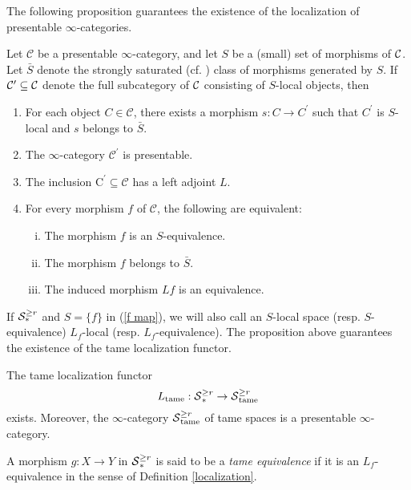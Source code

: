 The following proposition guarantees the existence of the localization of presentable $\infty$-categories.
\begin{proposition}
    \cite[Proposition 5.5.4.15.]{HTT}
    \label{Prop 5.5.4.15. HTT}
    Let $\mathcal{C}$ be a presentable $\infty$-category, and let $S$ be a (small) set of morphisms of ${\mathcal{C}}$. Let $\bar{S}$ denote the strongly saturated (cf. \cite[Definition 5.5.4.5.]{HTT}) class of morphisms generated by $S$. If $\mathcal{C}^{\prime} \subseteq {\mathcal{C}}$ denote the full subcategory of ${\mathcal{C}}$ consisting of $S$-local objects, then 
    \begin{enumerate}
        \item For each object $C \in \mathcal{C}$, there exists a morphism $s: C \rightarrow C^{\prime}$ such that $C^{\prime}$ is $S$-local and $s$ belongs to $\bar{S}$.
        \item The $\infty$-category $\mathcal{C}^{\prime}$ is presentable.
        \item The inclusion $\mathrm{C}^{\prime} \subseteq \mathcal{C}$ has a left adjoint $L$.
        \item For every morphism $f$ of $\mathcal{C}$, the following are equivalent:
        \begin{enumerate}[(i)]
            \item  The morphism $f$ is an $S$-equivalence.
            \item The morphism $f$ belongs to $\bar{S}$.
            \item The induced morphism $L f$ is an equivalence.
        \end{enumerate}
    \end{enumerate}
\end{proposition}
If ${\mathcal{S}}^{\geq r}_{*}$ and $S= \{f\}$ in (\ref{f map}), we will also call an $S$-local space (resp. $S$-equivalence) $L_f$-local (resp. $L_f$-equivalence).
The proposition above guarantees the existence of the tame localization functor. 
\begin{corollary}
\label{existence of tame localization}
The tame localization functor
$$
L_{\operatorname{\operatorname{tame}}}: \operatorname{\mathcal{S}}^{\geq r}_* \to \operatorname{\mathcal{S}}^{\geq r}_{\operatorname{\operatorname{tame}}}
$$
exists. Moreover, the $\infty$-category $\operatorname{\mathcal{S}}^{\geq r}_{\operatorname{\operatorname{tame}}}$ of tame spaces is a presentable $\infty$-category.
\end{corollary}
\begin{definition}
    A morphism $g:X \to Y$ in $\operatorname{\mathcal{S}}^{\geq r}_*$ is said to be a \emph{tame equivalence} if it is an $L_f$-equivalence in the sense of Definition \ref{localization}.
\end{definition}

